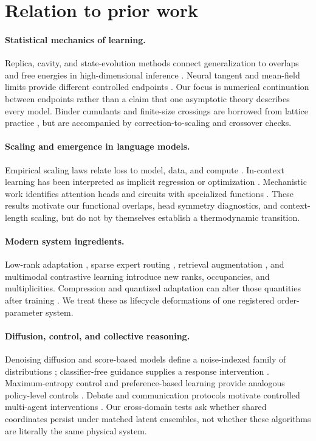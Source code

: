 \section{Relation to prior work}

\paragraph{Statistical mechanics of learning.}
Replica, cavity, and state-evolution methods connect generalization to overlaps and free
energies in high-dimensional inference \citep{mezard1987spin,zdeborova2016statistical}.
Neural tangent and mean-field limits provide different controlled endpoints
\citep{jacot2018neural}. Our focus is numerical continuation between endpoints rather than
a claim that one asymptotic theory describes every model. Binder cumulants and finite-size
crossings are borrowed from lattice practice \citep{binder1981critical}, but are accompanied
by correction-to-scaling and crossover checks.

\paragraph{Scaling and emergence in language models.}
Empirical scaling laws relate loss to model, data, and compute
\citep{kaplan2020scaling,hoffmann2022training}. In-context learning has been interpreted
as implicit regression or optimization \citep{akyurek2023learning,vonoswald2023transformers}.
Mechanistic work identifies attention heads and circuits with specialized functions
\citep{elhage2021mathematical}. These results motivate our functional overlaps, head
symmetry diagnostics, and context-length scaling, but do not by themselves establish a
thermodynamic transition.

\paragraph{Modern system ingredients.}
Low-rank adaptation \citep{hu2022lora}, sparse expert routing
\citep{shazeer2017outrageously,fedus2022switch}, retrieval augmentation
\citep{lewis2020retrieval}, and multimodal contrastive learning
\citep{radford2021learning} introduce new ranks, occupancies, and multiplicities.
Compression and quantized adaptation can alter those quantities after training
\citep{dettmers2023qlora}. We treat these as lifecycle deformations of one registered
order-parameter system.

\paragraph{Diffusion, control, and collective reasoning.}
Denoising diffusion and score-based models define a noise-indexed family of distributions
\citep{ho2020denoising,song2021score}; classifier-free guidance supplies a response
intervention \citep{ho2022classifierfree}. Maximum-entropy control and preference-based
learning provide analogous policy-level controls
\citep{sutton2018reinforcement,christiano2017deep}. Debate and communication protocols
motivate controlled multi-agent interventions \citep{irving2018ai}. Our cross-domain tests
ask whether shared coordinates persist under matched latent ensembles, not whether these
algorithms are literally the same physical system.
